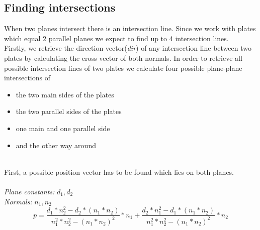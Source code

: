 \documentclass[../ClassicThesis.tex]{subfiles}
\begin{document}
\subsection{Finding intersections}\label{findIntersections}
When two planes intersect there is an intersection line. Since we work with plates which equal 2 parallel planes we expect to find up to 4 intersection lines.\\
Firstly, we retrieve the direction vector(\emph{dir}) of any intersection line between two plates by calculating the cross vector of both normals.
In order to retrieve all possible intersection lines of two plates we calculate four possible plane-plane intersections \cite{planePlaneIntersection} of 
\begin{itemize}
\item the two main sides of the plates
\item the two parallel sides of the plates
\item one main and one parallel side 
\item and the other way around
\end{itemize}
\*\\
First, a possible position vector has to be found which lies on both planes.
\\\*\\
\emph{Plane constants:} $d_1, d_2$\\
\emph{Normals:} $n_1, n_2$
$$ p = \frac{d_1 * n_{2}^{2} - d_2 * (n_1 * n_2)}{n_{1}^{2} * n_{2}^{2} - (n_1 * n_2)^{2}} * n_1 + \frac{d_2*n_1^2 - d_1*(n_1 * n_2)}{n_1^2 * n_2^2 - (n_1 * n_2)^2} * n_2 $$
\end{document}
